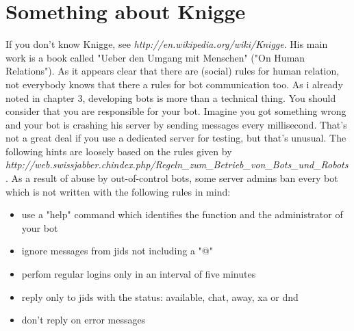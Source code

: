 \section{Something about Knigge}

If you don't know Knigge, see \textit{http://en.wikipedia.org/wiki/Knigge}.
\newline
His main work is a book called "Ueber den Umgang mit Menschen" ("On Human Relations").
\newline
As it appears clear that there are (social) rules for human relation, not everybody knows that there a rules
for bot communication too.
\newline
\newline
As i already noted in chapter 3, developing bots is more than a technical thing.
You should consider that you are responsible for your bot. Imagine you got something wrong and your bot is crashing his server by sending messages every millisecond. That's not a great deal if you use a dedicated server for testing, but that's unusual.
\newline
\newline
The following hints are loosely based on the rules given by
\newline
\textit{http://web.swissjabber.ch\/index.php/Regeln\_zum\_Betrieb\_von\_Bots\_und\_Robots}.
As a result of abuse by out-of-control bots, some server admins ban every bot which is not written with the following rules in mind:
\begin{itemize}
\item use a "help" command which identifies the function and the administrator of your bot
\item ignore messages from jids not including a "@"
\item perfom regular logins only in an interval of five minutes
\item reply only to jids with the status: available, chat, away, xa or dnd
\item don't reply on error messages
\end{itemize}


